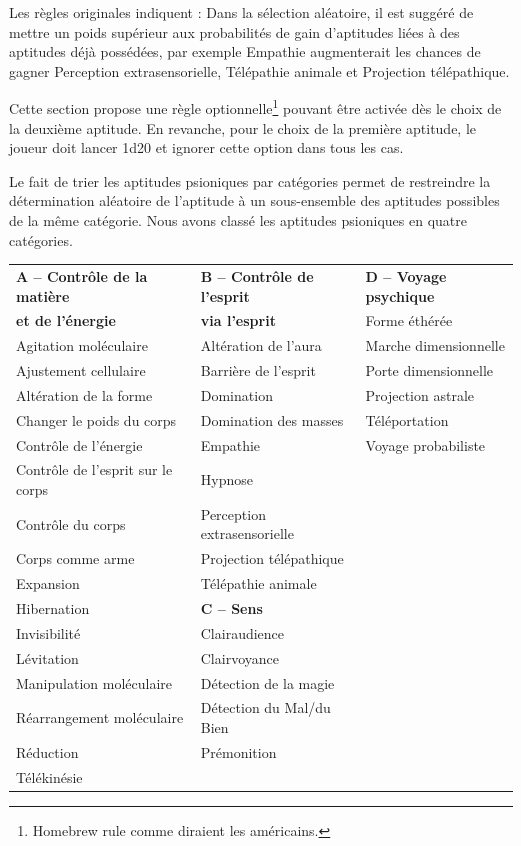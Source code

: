 \documentclass[11pt]{article}
\begin{document}
{Les règles originales indiquent : \og Dans la sélection aléatoire, il est suggéré de mettre un poids supérieur aux probabilités de gain d’aptitudes liées à des aptitudes déjà possédées, par exemple Empathie augmenterait les chances de gagner Perception extrasensorielle, Télépathie animale et Projection télépathique\fg{}.

\bigskip

Cette section propose une règle optionnelle\footnote{\og Homebrew rule \fg{} comme diraient les américains.} pouvant être activée dès le choix de la deuxième aptitude. En revanche, pour le choix de la première aptitude, le joueur doit lancer 1d20 et ignorer cette option dans tous les cas.

\bigskip

Le fait de trier les aptitudes psioniques par catégories permet de restreindre la détermination aléatoire de l'aptitude à un sous-ensemble des aptitudes possibles de la même catégorie. Nous avons classé les aptitudes psioniques en quatre catégories.

\bigskip

\begin{tabular}{p{5.5cm}p{5.5cm}p{5.5cm}}
\textbf{A -- Contrôle de la matière} & \textbf{B -- Contrôle de l'esprit}   & \textbf{D -- Voyage psychique} \\
\textbf{et de l'énergie}             & \textbf{via l'esprit}                & Forme éthérée \\
Agitation moléculaire                & Altération de l'aura                 & Marche dimensionnelle \\
Ajustement cellulaire               & Barrière de l'esprit                 & Porte dimensionnelle \\
Altération de la forme              & Domination                           & Projection astrale \\
Changer le poids du corps           & Domination des masses                & Téléportation \\
Contrôle de l'énergie               & Empathie                             &  Voyage probabiliste\\
Contrôle de l'esprit sur le corps   & Hypnose & \\
Contrôle du corps                   & Perception extrasensorielle & \\
Corps comme arme                    & Projection télépathique &\\
Expansion                           & Télépathie animale &\\
Hibernation                         & \textbf{C -- Sens} & \\
Invisibilité                        & Clairaudience & \\
Lévitation                          & Clairvoyance & \\
Manipulation moléculaire            & Détection de la magie & \\
Réarrangement moléculaire           & Détection du Mal/du Bien & \\
Réduction                           & Prémonition & \\
Télékinésie                && \\
\end{tabular}

}
\end{document}
